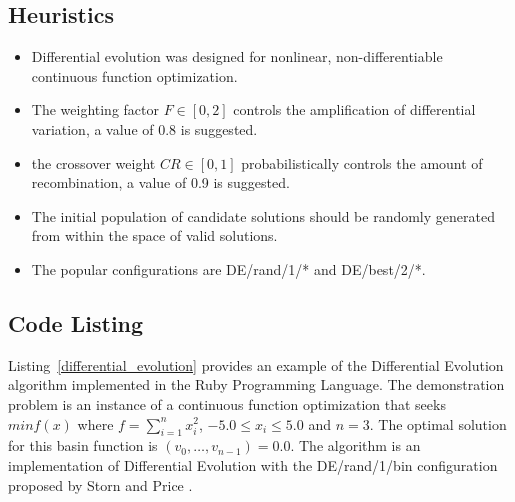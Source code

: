 \subsection{Heuristics}
\begin{itemize}
	\item Differential evolution was designed for nonlinear, non-differentiable continuous function optimization.
	\item The weighting factor $F \in [0,2]$ controls the amplification of differential variation, a value of 0.8 is suggested.
	\item the crossover weight $CR \in [0,1]$ probabilistically controls the amount of recombination, a value of 0.9 is suggested.
	\item The initial population of candidate solutions should be randomly generated from within the space of valid solutions.
	\item The popular configurations are DE/rand/1/* and DE/best/2/*. 
\end{itemize}

\subsection{Code Listing}
Listing~\ref{differential_evolution} provides an example of the Differential Evolution algorithm implemented in the Ruby Programming Language.
The demonstration problem is an instance of a continuous function optimization that seeks $min f(x)$ where $f=\sum_{i=1}^n x_{i}^2$, $-5.0\leq x_i \leq 5.0$ and $n=3$. The optimal solution for this basin function is $(v_0,\ldots,v_{n-1})=0.0$.
The algorithm is an implementation of Differential Evolution with the DE/rand/1/bin configuration proposed by Storn and Price \cite{Storn1997}.

